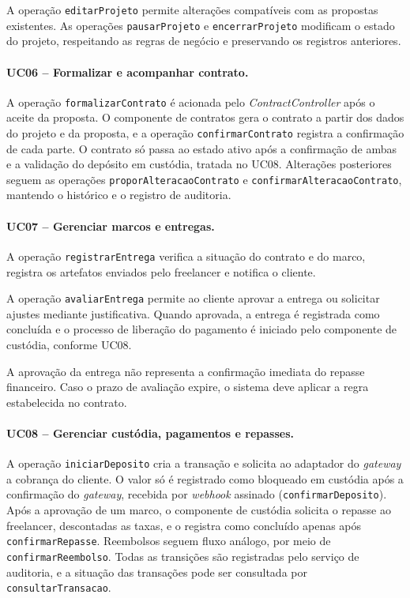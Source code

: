 \documentclass[portuguese]{sbcreviews-2025}
\begin{document}
A operação \texttt{editarProjeto} permite alterações
compatíveis com as propostas existentes. As operações
\texttt{pausarProjeto} e \texttt{encerrarProjeto}
modificam o estado do projeto, respeitando as regras
de negócio e preservando os registros anteriores.

\paragraph{UC06 -- Formalizar e acompanhar contrato.}

A operação \texttt{formalizarContrato} é acionada pelo
\textit{ContractController} após o aceite da proposta. O
componente de contratos gera o contrato a partir dos dados do
projeto e da proposta, e a operação \texttt{confirmarContrato}
registra a confirmação de cada parte. O contrato só passa ao
estado ativo após a confirmação de ambas e a validação do
depósito em custódia, tratada no UC08. Alterações posteriores
seguem as operações \texttt{proporAlteracaoContrato} e
\texttt{confirmarAlteracaoContrato}, mantendo o histórico e o
registro de auditoria.

\paragraph{UC07 -- Gerenciar marcos e entregas.}

A operação \texttt{registrarEntrega} verifica a situação
do contrato e do marco, registra os artefatos enviados
pelo freelancer e notifica o cliente.

A operação \texttt{avaliarEntrega} permite ao cliente
aprovar a entrega ou solicitar ajustes mediante
justificativa. Quando aprovada, a entrega é registrada
como concluída e o processo de liberação do pagamento
é iniciado pelo componente de custódia, conforme UC08.

A aprovação da entrega não representa a confirmação
imediata do repasse financeiro. Caso o prazo de
avaliação expire, o sistema deve aplicar a regra
estabelecida no contrato.

\paragraph{UC08 -- Gerenciar custódia, pagamentos e repasses.}

A operação \texttt{iniciarDeposito} cria a transação e solicita
ao adaptador do \textit{gateway} a cobrança do cliente. O valor
só é registrado como bloqueado em custódia após a confirmação
do \textit{gateway}, recebida por \textit{webhook} assinado
(\texttt{confirmarDeposito}). Após a aprovação de um marco, o
componente de custódia solicita o repasse ao freelancer,
descontadas as taxas, e o registra como concluído apenas após
\texttt{confirmarRepasse}. Reembolsos seguem fluxo análogo, por
meio de \texttt{confirmarReembolso}. Todas as transições são
registradas pelo serviço de auditoria, e a situação das
transações pode ser consultada por \texttt{consultarTransacao}.
\end{document}
